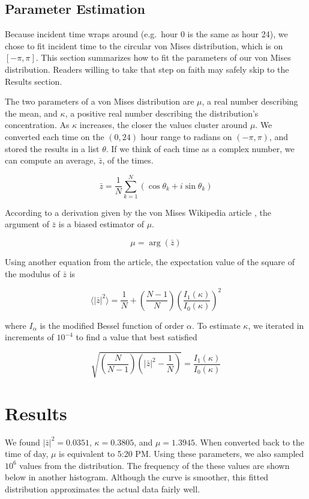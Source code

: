 \documentclass[12pt]{article}
\begin{document}
    \subsection{Parameter Estimation}
      Because incident time wraps around (e.g.\ hour 0 is the same as hour 24),
      we chose to fit incident time to the circular von Mises distribution,
      which is on \([-\pi, \pi]\). This section summarizes how to fit the
      parameters of our von Mises distribution. Readers willing to take that
      step on faith may safely skip to the Results section.

      The two parameters of a von Mises distribution are \(\mu\), a real number
      describing the mean, and \(\kappa\), a positive real number describing
      the distribution's concentration. As \(\kappa\) increases, the closer the
      values cluster around \(\mu\). We converted each time on the \((0, 24)\)
      hour range to radians on \((-\pi, \pi)\), and stored the results in a
      list \(\theta\). If we think of each time as a complex number, we can
      compute an average, \(\bar{z}\), of the times.

      \[\bar{z} = \frac{1}{N} \sum_{k=1}^N (\cos \theta_k + i \sin \theta_k)\]

      \pagebreak

      According to a derivation given by the von Mises Wikipedia article
      \cite{von_mises}, the argument of \(\bar{z}\) is a biased estimator of
      \(\mu\).

      \[\mu = \arg (\bar{z})\]

      Using another equation from the article, the expectation value of the
      square of the modulus of \(\bar{z}\) is

      \[\langle |\bar{z}|^2 \rangle = \frac{1}{N} + \left(\frac{N - 1}{N}
      \right) \left(\frac{I_1(\kappa)}{I_0(\kappa)} \right)^2\]

      where \(I_\alpha\) is the modified Bessel function of order \(\alpha\).
      To estimate \(\kappa\), we iterated in increments of \(10^{-4}\) to find
      a value that best satisfied

      \[\sqrt{\left(\frac{N}{N - 1} \right) \left(|\bar{z}|^2 - \frac{1}{N}
      \right)} = \frac{I_1(\kappa)}{I_0(\kappa)}\]

  \section{Results}
    We found \(|\bar{z}|^2 = 0.0351\), \(\kappa = 0.3805\), and \(\mu =
    1.3945\). When converted back to the time of day, \(\mu\) is equivalent to
    5:20 PM. Using these parameters, we also sampled \(10^6\) values from the
    distribution. The frequency of the these values are shown below in another
    histogram. Although the curve is smoother, this fitted distribution
    approximates the actual data fairly well.
\end{document}
